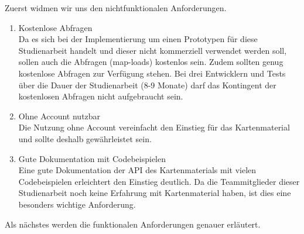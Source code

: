Zuerst widmen wir uns den nichtfunktionalen Anforderungen.
\begin{enumerate}
\item Kostenlose Abfragen \\
Da es sich bei der Implementierung um einen Prototypen für diese Studienarbeit handelt und dieser nicht kommerziell verwendet werden soll, sollen auch die Abfragen (map-loads) kostenlos sein. Zudem sollten genug kostenlose Abfragen zur Verfügung stehen. Bei drei Entwicklern und Tests über die Dauer der Studienarbeit (8-9 Monate) darf das Kontingent der kostenlosen Abfragen nicht aufgebraucht sein.

\item Ohne Account nutzbar\\
Die Nutzung ohne Account vereinfacht den Einstieg für das Kartenmaterial und sollte deshalb gewährleistet sein. 

\item Gute Dokumentation mit Codebeispielen\\
Eine gute Dokumentation der API des Kartenmaterials mit vielen Codebeispielen erleichtert den Einstieg deutlich. Da die Teammitglieder dieser Studienarbeit noch keine Erfahrung mit Kartenmaterial haben, ist dies eine besonders wichtige Anforderung. 


\end{enumerate}



Als nächstes werden die funktionalen Anforderungen genauer erläutert.

